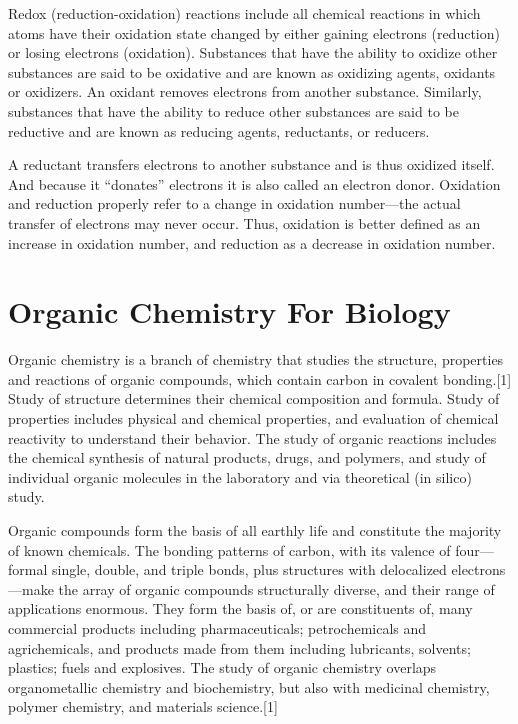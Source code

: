 \documentclass[
]{book}
\begin{document}
Redox (reduction-oxidation) reactions include all chemical reactions in which atoms have their oxidation state changed by either gaining electrons (reduction) or losing electrons (oxidation). Substances that have the ability to oxidize other substances are said to be oxidative and are known as oxidizing agents, oxidants or oxidizers. An oxidant removes electrons from another substance. Similarly, substances that have the ability to reduce other substances are said to be reductive and are known as reducing agents, reductants, or reducers.

A reductant transfers electrons to another substance and is thus oxidized itself. And because it ``donates'' electrons it is also called an electron donor. Oxidation and reduction properly refer to a change in oxidation number---the actual transfer of electrons may never occur. Thus, oxidation is better defined as an increase in oxidation number, and reduction as a decrease in oxidation number.

\hypertarget{organic-chemistry-for-biology}{%
\chapter{Organic Chemistry For Biology}\label{organic-chemistry-for-biology}}

Organic chemistry is a branch of chemistry that studies the structure, properties and reactions of organic compounds, which contain carbon in covalent bonding.{[}1{]} Study of structure determines their chemical composition and formula. Study of properties includes physical and chemical properties, and evaluation of chemical reactivity to understand their behavior. The study of organic reactions includes the chemical synthesis of natural products, drugs, and polymers, and study of individual organic molecules in the laboratory and via theoretical (in silico) study.

Organic compounds form the basis of all earthly life and constitute the majority of known chemicals. The bonding patterns of carbon, with its valence of four---formal single, double, and triple bonds, plus structures with delocalized electrons---make the array of organic compounds structurally diverse, and their range of applications enormous. They form the basis of, or are constituents of, many commercial products including pharmaceuticals; petrochemicals and agrichemicals, and products made from them including lubricants, solvents; plastics; fuels and explosives. The study of organic chemistry overlaps organometallic chemistry and biochemistry, but also with medicinal chemistry, polymer chemistry, and materials science.{[}1{]}
\end{document}
